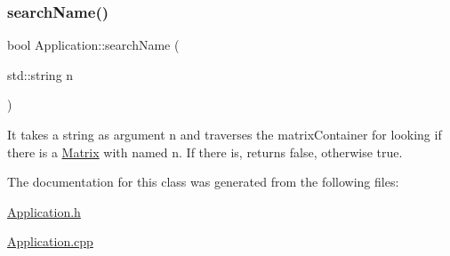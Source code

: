 \subsubsection{\texorpdfstring{search\+Name()}{searchName()}}
{\footnotesize\ttfamily bool Application\+::search\+Name (\begin{DoxyParamCaption}\item[{std\+::string}]{n }\end{DoxyParamCaption})}

It takes a string as argument n and traverses the matrix\+Container for looking if there is a \hyperlink{class_matrix}{Matrix} with named n. If there is, returns false, otherwise true. 

The documentation for this class was generated from the following files\+:\begin{DoxyCompactItemize}
\item 
\hyperlink{_application_8h}{Application.\+h}\item 
\hyperlink{_application_8cpp}{Application.\+cpp}\end{DoxyCompactItemize}
